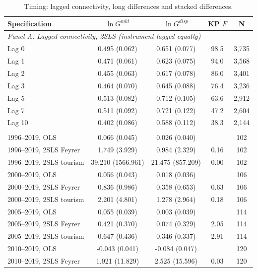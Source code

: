\begin{table}[H]\centering\caption{Timing: lagged connectivity, long differences and stacked differences.}\label{tab:horizon}
\begin{threeparttable}\small\begin{tabular}{lcccc}
\toprule
Specification & $\ln G^{mkt}$ & $\ln G^{disp}$ & KP $F$ & N \\
\midrule
\multicolumn{5}{l}{\emph{Panel A. Lagged connectivity, 2SLS (instrument lagged equally)}}\\
Lag 0 & 0.495\sym{***} (0.062) & 0.651\sym{***} (0.077) & 98.5 & 3,735 \\
Lag 1 & 0.471\sym{***} (0.061) & 0.623\sym{***} (0.075) & 94.0 & 3,568 \\
Lag 2 & 0.455\sym{***} (0.063) & 0.617\sym{***} (0.078) & 86.0 & 3,401 \\
Lag 3 & 0.464\sym{***} (0.070) & 0.645\sym{***} (0.088) & 76.4 & 3,236 \\
Lag 5 & 0.513\sym{***} (0.082) & 0.712\sym{***} (0.105) & 63.6 & 2,912 \\
Lag 7 & 0.511\sym{***} (0.092) & 0.721\sym{***} (0.122) & 47.2 & 2,604 \\
Lag 10 & 0.402\sym{***} (0.086) & 0.588\sym{***} (0.112) & 38.3 & 2,144 \\
\addlinespace\multicolumn{5}{l}{\emph{Panel B. Long differences, cross-section with continent FE}}\\
1996--2019, OLS & 0.066 (0.045) & 0.026 (0.040) &  & 102 \\
1996--2019, 2SLS Feyrer & 1.749 (3.929) & 0.984 (2.329) & 0.16 & 102 \\
1996--2019, 2SLS tourism & 39.210 (1566.961) & 21.475 (857.209) & 0.00 & 102 \\
2000--2019, OLS & 0.056 (0.043) & 0.018 (0.036) &  & 106 \\
2000--2019, 2SLS Feyrer & 0.836 (0.986) & 0.358 (0.653) & 0.63 & 106 \\
2000--2019, 2SLS tourism & 2.201 (4.801) & 1.278 (2.964) & 0.18 & 106 \\
2005--2019, OLS & 0.055 (0.039) & 0.003 (0.039) &  & 114 \\
2005--2019, 2SLS Feyrer & 0.421 (0.370) & 0.074 (0.329) & 2.05 & 114 \\
2005--2019, 2SLS tourism & 0.647 (0.436) & 0.346 (0.337) & 2.91 & 114 \\
2010--2019, OLS & -0.043 (0.041) & -0.084\sym{*} (0.047) &  & 120 \\
2010--2019, 2SLS Feyrer & 1.921 (11.829) & 2.525 (15.596) & 0.03 & 120 \\

\end{tabular}
\end{threeparttable}
\end{table}
